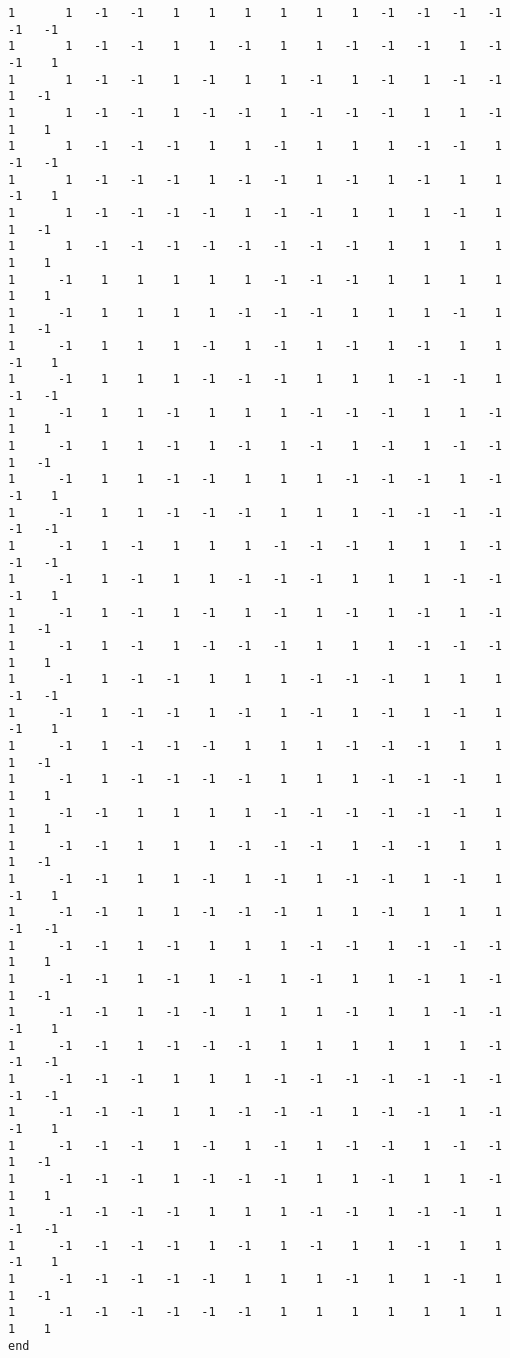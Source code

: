 \documentclass[%
  twocolumn,
 showpacs,
 showkeys,
 preprintnumbers,
 amsmath,amssymb,
 aps,
  pra,
  longbibliography,
 floatfix,
 ]{revtex4-1}
\begin{document}
{\begin{lstlisting}[backgroundcolor=\color{yellow!10},framerule=0pt,breaklines=true, frame=tb]
1       1   -1   -1    1    1    1    1    1    1   -1   -1   -1   -1   -1   -1
1       1   -1   -1    1    1   -1    1    1   -1   -1   -1    1   -1   -1    1
1       1   -1   -1    1   -1    1    1   -1    1   -1    1   -1   -1    1   -1
1       1   -1   -1    1   -1   -1    1   -1   -1   -1    1    1   -1    1    1
1       1   -1   -1   -1    1    1   -1    1    1    1   -1   -1    1   -1   -1
1       1   -1   -1   -1    1   -1   -1    1   -1    1   -1    1    1   -1    1
1       1   -1   -1   -1   -1    1   -1   -1    1    1    1   -1    1    1   -1
1       1   -1   -1   -1   -1   -1   -1   -1   -1    1    1    1    1    1    1
1      -1    1    1    1    1    1   -1   -1   -1    1    1    1    1    1    1
1      -1    1    1    1    1   -1   -1   -1    1    1    1   -1    1    1   -1
1      -1    1    1    1   -1    1   -1    1   -1    1   -1    1    1   -1    1
1      -1    1    1    1   -1   -1   -1    1    1    1   -1   -1    1   -1   -1
1      -1    1    1   -1    1    1    1   -1   -1   -1    1    1   -1    1    1
1      -1    1    1   -1    1   -1    1   -1    1   -1    1   -1   -1    1   -1
1      -1    1    1   -1   -1    1    1    1   -1   -1   -1    1   -1   -1    1
1      -1    1    1   -1   -1   -1    1    1    1   -1   -1   -1   -1   -1   -1
1      -1    1   -1    1    1    1   -1   -1   -1    1    1    1   -1   -1   -1
1      -1    1   -1    1    1   -1   -1   -1    1    1    1   -1   -1   -1    1
1      -1    1   -1    1   -1    1   -1    1   -1    1   -1    1   -1    1   -1
1      -1    1   -1    1   -1   -1   -1    1    1    1   -1   -1   -1    1    1
1      -1    1   -1   -1    1    1    1   -1   -1   -1    1    1    1   -1   -1
1      -1    1   -1   -1    1   -1    1   -1    1   -1    1   -1    1   -1    1
1      -1    1   -1   -1   -1    1    1    1   -1   -1   -1    1    1    1   -1
1      -1    1   -1   -1   -1   -1    1    1    1   -1   -1   -1    1    1    1
1      -1   -1    1    1    1    1   -1   -1   -1   -1   -1   -1    1    1    1
1      -1   -1    1    1    1   -1   -1   -1    1   -1   -1    1    1    1   -1
1      -1   -1    1    1   -1    1   -1    1   -1   -1    1   -1    1   -1    1
1      -1   -1    1    1   -1   -1   -1    1    1   -1    1    1    1   -1   -1
1      -1   -1    1   -1    1    1    1   -1   -1    1   -1   -1   -1    1    1
1      -1   -1    1   -1    1   -1    1   -1    1    1   -1    1   -1    1   -1
1      -1   -1    1   -1   -1    1    1    1   -1    1    1   -1   -1   -1    1
1      -1   -1    1   -1   -1   -1    1    1    1    1    1    1   -1   -1   -1
1      -1   -1   -1    1    1    1   -1   -1   -1   -1   -1   -1   -1   -1   -1
1      -1   -1   -1    1    1   -1   -1   -1    1   -1   -1    1   -1   -1    1
1      -1   -1   -1    1   -1    1   -1    1   -1   -1    1   -1   -1    1   -1
1      -1   -1   -1    1   -1   -1   -1    1    1   -1    1    1   -1    1    1
1      -1   -1   -1   -1    1    1    1   -1   -1    1   -1   -1    1   -1   -1
1      -1   -1   -1   -1    1   -1    1   -1    1    1   -1    1    1   -1    1
1      -1   -1   -1   -1   -1    1    1    1   -1    1    1   -1    1    1   -1
1      -1   -1   -1   -1   -1   -1    1    1    1    1    1    1    1    1    1
end


\end{lstlisting}}
\end{document}
